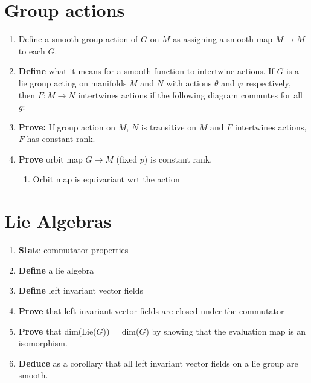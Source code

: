 \documentclass[prb,12pt]{revtex4-2}
\theoremstyle{definition}
\theoremstyle{definition}
\begin{document}
\section{Group actions}
\begin{enumerate}[resume]
	\item Define a smooth group action of $G$ on $M$ as assigning a smooth map $M \to M$ to each $G$.
	\item \textbf{Define} what it means for a smooth function to intertwine actions. If $G$ is a lie group acting on manifolds $M$ and $N$ with actions $\theta$ and $\varphi$ respectively, then $F:M\to N$ intertwines actions if the following diagram commutes for all $g$:
	\begin{center}
	\end{center}
	\item \textbf{Prove:} If group action on $M$, $N$ is transitive on $M$ and $F$ intertwines actions, $F$ has constant rank.
		\begin{center}
	\end{center}
	\item \textbf{Prove} orbit map $G\to M$ (fixed $p$) is constant rank.
		\begin{enumerate}
		\item Orbit map is equivariant wrt the action
	\end{enumerate}
\end{enumerate}
\section{Lie Algebras}
\begin{enumerate}[resume]
	\item \textbf{State} commutator properties
		\item \textbf{Define} a lie algebra
	\item \textbf{Define} left invariant vector fields
	\item \textbf{Prove} that left invariant vector fields are closed under the commutator
	\item \textbf{Prove} that dim(Lie($G$)) = dim($G$) by showing that the evaluation map is an isomorphism.
	\item \textbf{Deduce} as a corollary that all left invariant vector fields on a lie group are smooth.
\end{enumerate}
\end{document}
